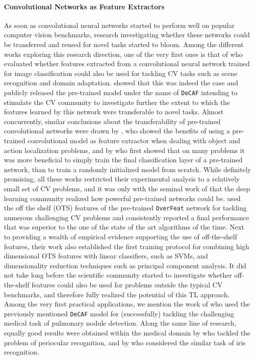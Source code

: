 \paragraph{Convolutional Networks as Feature Extractors}
As soon as convolutional neural networks started to perform well on popular computer vision benchmarks, research investigating whether these networks could be transferred and reused for novel tasks started to bloom. Among the different works exploring this research direction, one of the very first ones is that of \citet{donahue2014decaf} who evaluated whether features extracted from a convolutional neural network trained for image classification could also be used for tackling CV tasks such as scene recognition and domain adaptation. \citet{donahue2014decaf} showed that this was indeed the case and publicly released the pre-trained model under the name of \texttt{DeCAF} intending to stimulate the CV community to investigate further the extent to which the features learned by this network were transferable to novel tasks. Almost concurrently, similar conclusions about the transferability of pre-trained convolutional networks were drawn by \citet{oquab2014learning}, who showed the benefits of using a pre-trained convolutional model as feature extractor when dealing with object and action localization problems, and by \citet{zeiler2014visualizing} who first showed that on many problems it was more beneficial to simply train the final classification layer of a pre-trained network, than to train a randomly initialized model from scratch. While definitely promising, all these works restricted their experimental analysis to a relatively small set of CV problems, and it was only with the seminal work of \citet{sharif2014cnn} that the deep learning community realized how powerful pre-trained networks could be. \citet{sharif2014cnn} used the off the shelf (OTS) features of the pre-trained \texttt{OverFeat} network \cite{sermanet2013overfeat} for tackling numerous challenging CV problems and consistently reported a final performance that was superior to the one of the state of the art algorithms of the time. Next to providing a wealth of empirical evidence supporting the use of off-the-shelf features, their work also established the first training protocol for combining high dimensional OTS features with linear classifiers, such as SVMs, and dimensionality reduction techniques such as principal component analysis. It did not take long before the scientific community started to investigate whether off-the-shelf features could also be used for problems outside the typical CV benchmarks, and therefore fully realized the potential of this TL approach. Among the very first practical applications, we mention the work of \citet{van2015off} who used the previously mentioned \texttt{DeCAF} model for (successfully) tackling the challenging medical task of pulmonary nodule detection. Along the same line of research, equally good results were obtained within the medical domain by \citet{hernandez2018periocular} who tackled the problem of periocular recognition, and by \citet{nguyen2017iris} who considered the similar task of iris recognition.

